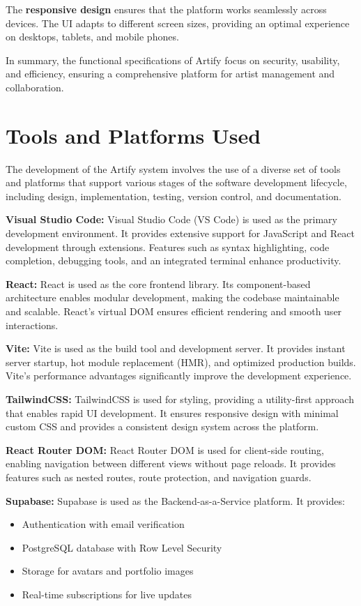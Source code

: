 \documentclass[12pt,a4paper]{report}
\begin{document}
The \textbf{responsive design} ensures that the platform works seamlessly across devices. The UI adapts to different screen sizes, providing an optimal experience on desktops, tablets, and mobile phones.

In summary, the functional specifications of Artify focus on security, usability, and efficiency, ensuring a comprehensive platform for artist management and collaboration.

\section{Tools and Platforms Used}

The development of the Artify system involves the use of a diverse set of tools and platforms that support various stages of the software development lifecycle, including design, implementation, testing, version control, and documentation.

\textbf{Visual Studio Code:}  
Visual Studio Code (VS Code) is used as the primary development environment. It provides extensive support for JavaScript and React development through extensions. Features such as syntax highlighting, code completion, debugging tools, and an integrated terminal enhance productivity.

\textbf{React:}  
React is used as the core frontend library. Its component-based architecture enables modular development, making the codebase maintainable and scalable. React's virtual DOM ensures efficient rendering and smooth user interactions.

\textbf{Vite:}  
Vite is used as the build tool and development server. It provides instant server startup, hot module replacement (HMR), and optimized production builds. Vite's performance advantages significantly improve the development experience.

\textbf{TailwindCSS:}  
TailwindCSS is used for styling, providing a utility-first approach that enables rapid UI development. It ensures responsive design with minimal custom CSS and provides a consistent design system across the platform.

\textbf{React Router DOM:}  
React Router DOM is used for client-side routing, enabling navigation between different views without page reloads. It provides features such as nested routes, route protection, and navigation guards.

\textbf{Supabase:}  
Supabase is used as the Backend-as-a-Service platform. It provides:
\begin{itemize}
    \item Authentication with email verification
    \item PostgreSQL database with Row Level Security
    \item Storage for avatars and portfolio images
    \item Real-time subscriptions for live updates
\end{itemize}
\end{document}

